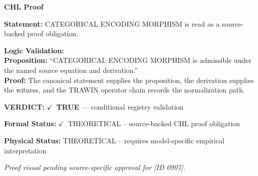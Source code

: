 \vspace{0.45em}
\noindent\textbf{CHL Proof}\par
\textbf{Statement:} CATEGORICAL ENCODING MORPHISM is read as a source-backed proof obligation.

\textbf{Logic Validation:}\\
\textbf{Proposition:} ``CATEGORICAL ENCODING MORPHISM is admissible under the named source equation and derivation.''\\
\textbf{Proof:} The canonical statement supplies the proposition, the derivation supplies the witness, and the TRAWIN operator chain records the normalization path.

\textbf{VERDICT:} \ensuremath{\checkmark}\ \textbf{TRUE} --- conditional registry validation

\textbf{Formal Status:} \ensuremath{\checkmark}\ THEORETICAL -- source-backed CHL proof obligation

\textbf{Physical Status:} THEORETICAL -- requires model-specific empirical interpretation
\par\vspace{0.45em}
\par
\vfill
\begingroup\footnotesize\itshape
Proof visual pending source-specific approval for [ID 0907].
\par\endgroup
\vfill
\endgroup
\endgroup
